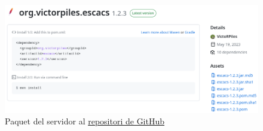 \begin{figure}[H]
    \centering
    \includegraphics[width=\textwidth]{images/maven-publish.png}
    \caption{Paquet del servidor al \href{https://github.com/VictoRPiles/escacs}{repositori de GitHub}}
    \label{fig:Maven Deploy i GitHub Packages}
\end{figure}
